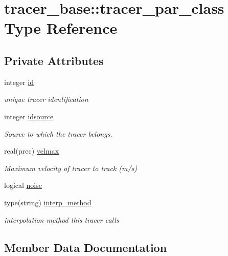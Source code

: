 \hypertarget{structtracer__base_1_1tracer__par__class}{}\section{tracer\+\_\+base\+:\+:tracer\+\_\+par\+\_\+class Type Reference}
\label{structtracer__base_1_1tracer__par__class}
\subsection*{Private Attributes}
\begin{DoxyCompactItemize}
\item 
integer \mbox{\hyperlink{structtracer__base_1_1tracer__par__class_ad7d0637c337b16787b0469e0bf5dfced}{id}}
\begin{DoxyCompactList}\small\item\em unique tracer identification \end{DoxyCompactList}\item 
integer \mbox{\hyperlink{structtracer__base_1_1tracer__par__class_a645bcb4eb7a0087394bd7eced244819d}{idsource}}
\begin{DoxyCompactList}\small\item\em Source to which the tracer belongs. \end{DoxyCompactList}\item 
real(prec) \mbox{\hyperlink{structtracer__base_1_1tracer__par__class_a7a6df785a9abc654a774b25fedb3c1e6}{velmax}}
\begin{DoxyCompactList}\small\item\em Maximum velocity of tracer to track (m/s) \end{DoxyCompactList}\item 
logical \mbox{\hyperlink{structtracer__base_1_1tracer__par__class_a6ed144d3b2b37e7e6d3fe9294cbb568d}{noise}}
\item 
type(string) \mbox{\hyperlink{structtracer__base_1_1tracer__par__class_a12aa1da016c290ce194cd779b1b00854}{interp\+\_\+method}}
\begin{DoxyCompactList}\small\item\em interpolation method this tracer calls \end{DoxyCompactList}\end{DoxyCompactItemize}


\subsection{Member Data Documentation}
\mbox{\label{structtracer__base_1_1tracer__par__class_ad7d0637c337b16787b0469e0bf5dfced}} 
